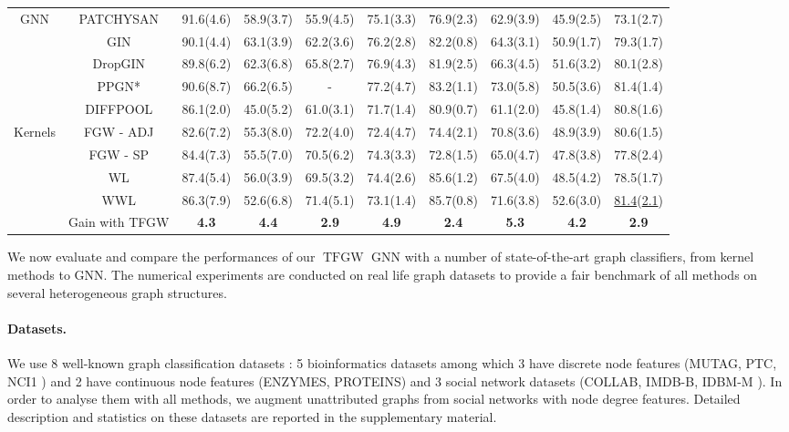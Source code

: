 \documentclass{article}
\newcommand{\TFGW}{\operatorname{TFGW}}
\begin{document}
\begin{table}[t!]
\begin{center}
{\begin{tabular}{|c|c||c|c|c|c|c||c|c|c|}
				\hline
				GNN & PATCHYSAN & 91.6(4.6) & 58.9(3.7) & 55.9(4.5) & 75.1(3.3) & 76.9(2.3) & 62.9(3.9)& 45.9(2.5)& 73.1(2.7) \\
				& GIN & 90.1(4.4) & 63.1(3.9) & 62.2(3.6)&76.2(2.8) & 82.2(0.8) & 64.3(3.1)& 50.9(1.7)& 79.3(1.7)\\
& DropGIN & 89.8(6.2) & 62.3(6.8) & 65.8(2.7)&76.9(4.3) & 81.9(2.5) & 66.3(4.5) &  51.6(3.2)& 80.1(2.8) \\
				& PPGN* & 90.6(8.7) & 66.2(6.5) & - & 77.2(4.7) & 83.2(1.1) & 73.0(5.8) & 50.5(3.6) & 81.4(1.4)\\
				& DIFFPOOL & 86.1(2.0) & 45.0(5.2) & 61.0(3.1) & 71.7(1.4) & 80.9(0.7) & 61.1(2.0)& 45.8(1.4) &80.8(1.6) \\ \hline
Kernels & FGW - ADJ & 82.6(7.2) & 55.3(8.0)& 72.2(4.0) & 72.4(4.7) & 74.4(2.1)&  70.8(3.6) & 48.9(3.9)& 80.6(1.5) \\
				& FGW - SP & 84.4(7.3) & 55.5(7.0) & 70.5(6.2) & 74.3(3.3) & 72.8(1.5)& 65.0(4.7) & 47.8(3.8)& 77.8(2.4)\\
& WL  & 87.4(5.4) & 56.0(3.9) & 69.5(3.2)& 74.4(2.6) & 85.6(1.2) &67.5(4.0) & 48.5(4.2)& 78.5(1.7)\\
				& WWL & 86.3(7.9) & 52.6(6.8) & 71.4(5.1) & 73.1(1.4) & 85.7(0.8) & 71.6(3.8) & 52.6(3.0)& \underline{81.4}(\underline{2.1})\\
				\hline \hline
				 & Gain with TFGW & \textbf{4.3} & \textbf{4.4} & \textbf{2.9} & \textbf{4.9}& \textbf{2.4}& \textbf{5.3}& \textbf{4.2} & \textbf{2.9}\\ \hline
		\end{tabular}}
	\end{center}
\end{table}

We now evaluate and compare the performances of our $\TFGW$ GNN with a
number of state-of-the-art  graph classifiers, from kernel methods to GNN. The
numerical experiments are conducted on real life graph datasets to provide a fair benchmark of all methods on several heterogeneous graph structures. 


\paragraph{Datasets.} We use 8 well-known graph classification datasets \cite{KKMMN2016}: 5
bioinformatics datasets among which 3  have discrete node features (MUTAG,
PTC, NCI1 \cite{kriege2012subgraph,shervashidze2011weisfeiler}) and 2 have continuous node features (ENZYMES, PROTEINS\cite{borgwardt2005protein}) and 3
social network datasets (COLLAB, IMDB-B, IDBM-M \cite{yanardag-deep-2015}). In order to analyse them with all methods, we augment unattributed graphs from social networks with node degree features. Detailed description and statistics on these datasets are reported in the supplementary material. 
\end{document}

